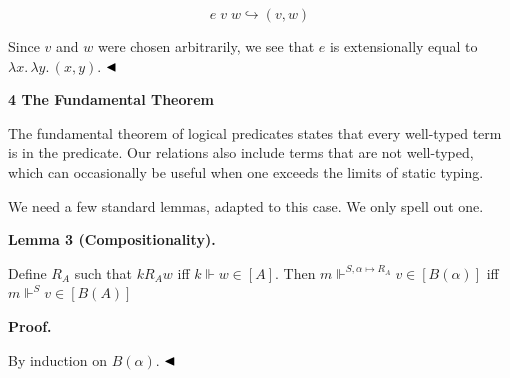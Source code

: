\documentclass[10pt,a4paper]{amsart}
\begin{document}
\par  \quad  \[e\;v\;w\mathrel{\hookrightarrow}(v,w)\]\quad  \quad  
  
Since $v$ and $w$ were chosen arbitrarily, we see that $e$ is extensionally equal to $\lambda x.\,\lambda y.\,(x,y)$. $\hfill\blacktriangleleft$\par
 
 
 


 
\par\medskip\noindent\textbf{4 The Fundamental Theorem}\par
 
 
The fundamental theorem of logical predicates states that every well-typed term is in the predicate. Our relations also include terms that are not well-typed, which can occasionally be useful when one exceeds the limits of static typing.\par
 
 
 
We need a few standard lemmas, adapted to this case. We only spell out one.\par
 
 
 
\par\medskip\noindent\textbf{Lemma 3 (Compositionality).}\par
 
 
Define $R_{A}$ such that $k\mathrel{R_{A}}w$ iff $k\Vdash w\in[A]$. Then $m\Vdash^{S,\alpha\mapsto R_{A}}v\in[B(\alpha)]$ iff $m\Vdash^{S}v\in[B(A)]$\par
 
 
 
 
\par\medskip\noindent\textbf{Proof.}\par
 
 
By induction on $B(\alpha)$. $\hfill\blacktriangleleft$\par
 
\end{document}
